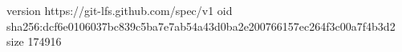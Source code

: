 version https://git-lfs.github.com/spec/v1
oid sha256:dcf6e0106037bc839c5ba7e7ab54a43d0ba2e200766157ec264f3c00a7f4b3d2
size 174916
